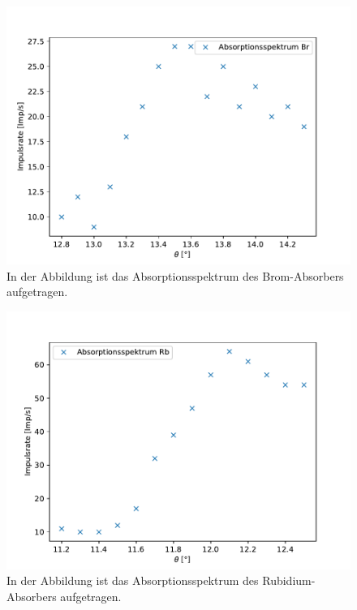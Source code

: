 \documentclass[titlepage = firstcover]{scrartcl}
\begin{document}
            \begin{figure}[h]
              \centering
              \includegraphics{Brom.pdf}
              \caption{In der Abbildung ist das Absorptionsspektrum des Brom-Absorbers aufgetragen.}
              \label{fig:Brom}
            \end{figure}

            \begin{figure}[h]
              \centering
              \includegraphics{Rubidium.pdf}
              \caption{In der Abbildung ist das Absorptionsspektrum des Rubidium-Absorbers aufgetragen.}
              \label{fig:Rubidium}
            \end{figure}
\end{document}
